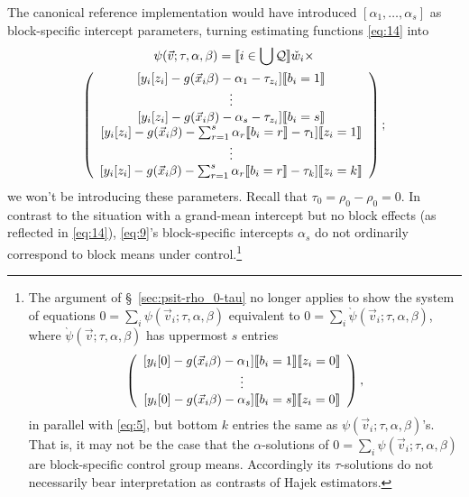 \documentclass{article}
\DeclarePairedDelimiter{\indicator}{\llbracket}{\rrbracket}
\newcommand{\owt}[1][{[z_{i}]}]{\ensuremath{\check{w}_{i#1}}}
\begin{document}
The canonical reference implementation would have introduced $[\alpha_{1}, \ldots, \alpha_{s}]$
as block-specific intercept parameters, turning
estimating functions \eqref{eq:14} into
\begin{multline}
  \label{eq:9}
  \psi(\vec{v}; \tau, \alpha, \beta) =
  \indicator{i \in \bigcup \mathcal{Q}} \owt[]\times \\
  \left(
    \begin{array}{c}
           [y_{i}[z_{i}] - g(\vec{x}_{i}\beta)-
                  \alpha_{1} -
      \tau_{z_{i}}]\indicator{b_{i}=1}\\
      \vdots\\
          {} [y_{i}[z_{i}] - g(\vec{x}_{i}\beta)-
                  \alpha_{s} -
      \tau_{z_{i}}]\indicator{b_{i}=s}\\
         {}  [y_{i}[z_{i}] - g(\vec{x}_{i}\beta)-
                  \sum_{r=1}^s\alpha_r\indicator{b_i=r}-\tau_{1}]\indicator{z_{i}=1}\\
                  \vdots \\
          {} [y_{i}[z_{i}] - g(\vec{x}_{i}\beta)-
                 \sum_{r=1}^s\alpha_r\indicator{b_i=r} - \tau_{k}]\indicator{z_{i}=k}\\
    \end{array}
\right);
\end{multline}
we won't be introducing these parameters.
Recall that $\tau_{0} = \rho_{0}-\rho_{0}=0$.
In contrast to the situation with a grand-mean
intercept but no block effects (as reflected in \eqref{eq:14}), \eqref{eq:9}'s block-specific intercepts $\alpha_s$ do not ordinarily correspond to block means under control.\footnote{%
The argument of \S~\ref{sec:psit-rho_0-tau} no longer applies
to show the system of equations
$0=\sum_{i}\psi(\vec{v}_{i}; \tau, \alpha, \beta)$
equivalent to $0=\sum_{i}\grave{\psi}(\vec{v}_{i}; \tau,
\alpha, \beta)$, where $\grave{\psi}(\vec{v}; \tau,
\alpha, \beta)$ has uppermost $s$ entries
\begin{equation*}
    \left(
    \begin{array}{c}
           [y_{i}[0] - g(\vec{x}_{i}\beta)-
                  \alpha_{1} ]\indicator{b_{i}=1} \indicator{z_{i}=0}\\
      \vdots\\
          {} [y_{i}[0] - g(\vec{x}_{i}\beta)-
                  \alpha_{s}]\indicator{b_{i}=s} \indicator{z_{i}=0}\\
    \end{array}
    \right),
  \end{equation*}
in parallel with \eqref{eq:5}, but bottom $k$ entries the same as ${\psi}(\vec{v}_{i}; \tau,
\alpha, \beta)$'s. That is, it may not be the case that the $\alpha$-solutions of
$0=\sum_{i}\psi(\vec{v}_{i}; \tau, \alpha, \beta)$ are
block-specific control group means.  Accordingly its $\tau$-solutions
do not necessarily bear interpretation as contrasts of Hajek estimators.
}
\end{document}
